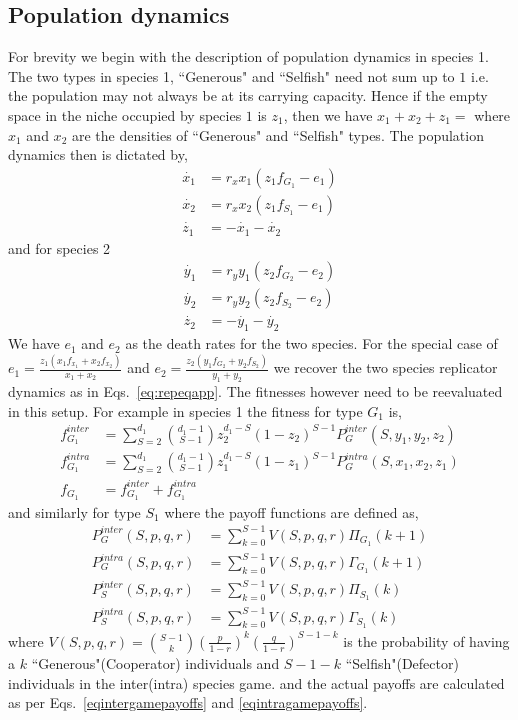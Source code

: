 \documentclass[12pt]{article}
\begin{document}
\begin{appendices}
\section{Population dynamics}

For brevity we begin with the description of population dynamics in species 1.
The two types in species 1, ``Generous" and ``Selfish" need not sum up to $1$ i.e. the population may not always be at its carrying capacity.
Hence if the empty space in the niche occupied by species $1$ is $z_1$, then we have $x_1 + x_2 + z_1 = $ where $x_1$ and $x_2$ are the densities of ``Generous" and ``Selfish" types.
The population dynamics then is dictated by,
%
\begin{align}
	\dot{x_1} &= r_x x_1 (z_1 f_{G_1} - e_1) \nonumber \\
	\dot{x_2} &= r_x x_2 (z_1 f_{S_1} - e_1) \\
	\dot{z_1} &= - \dot{x_1} - \dot{x_2} \nonumber
\end{align}
%
and for species 2
\begin{align}
	\dot{y_1} &= r_y y_1 (z_2 f_{G_2} - e_2) \nonumber \\
	\dot{y_2} &= r_y y_2 (z_2 f_{S_2} - e_2) \\
	\dot{z_2} &= - \dot{y_1} - \dot{y_2} \nonumber
\end{align}
%
We have $e_1$ and $e_2$ as the death rates for the two species. 
For the special case of  $e_1 = \frac{z_1 (x_1 f_{x_1} + x_2 f_{x_2}) }{x_1 + x_2}$ and $e_2 = \frac{z_2 (y_1 f_{G_2} + y_2 f_{S_2}) }{y_1 + y_2}$ we recover the two species replicator dynamics as in Eqs.~\ref{eq:repeqapp}. 
The fitnesses however need to be reevaluated in this setup.
For example in species 1 the fitness for type $G_1$ is,
%
\begin{align}
	f_{G_1}^{inter} &= \sum_{S=2}^{d_1} \binom{d_1 -1}{S-1} z_2 ^{d_1 -S} (1-z_2)^{S-1} P_G^{inter}(S,y_1,y_2,z_2) \nonumber \\
	f_{G_1}^{intra} &= \sum_{S=2}^{d_1} \binom{d_1 -1}{S-1} z_1 ^{d_1 -S} (1-z_1)^{S-1} P_G^{intra}(S,x_1,x_2,z_1) \\
	f_{G_1} &= f_{G_1}^{inter} + f_{G_1}^{intra}
\end{align}
%
and similarly for type $S_1$ where the payoff functions are defined as,
%
\begin{align}
	P_G^{inter}(S,p,q,r) &= \sum_{k=0}^{S-1} V(S,p,q,r) \Pi_{G_1}(k+1) \\
	P_G^{intra}(S,p,q,r) &= \sum_{k=0}^{S-1} V(S,p,q,r) \Gamma_{G_1}(k+1) \\
	P_S^{inter}(S,p,q,r) &= \sum_{k=0}^{S-1} V(S,p,q,r) \Pi_{S_1}(k) \\
	P_S^{intra}(S,p,q,r) &= \sum_{k=0}^{S-1} V(S,p,q,r) \Gamma_{S_1}(k)
\end{align}
%
where $V(S,p,q,r) = \binom{S-1}{k} \left( \frac{p}{1-r}\right)^k  \left(\frac{q}{1-r}\right)^{S-1-k}$ is the probability of having a $k$ ``Generous"(Cooperator) individuals and $S-1-k$ ``Selfish"(Defector) individuals in the inter(intra) species game.
and the actual payoffs are calculated as per Eqs.~\ref{eqintergamepayoffs} and \ref{eqintragamepayoffs}.

\end{appendices}
\end{document}
